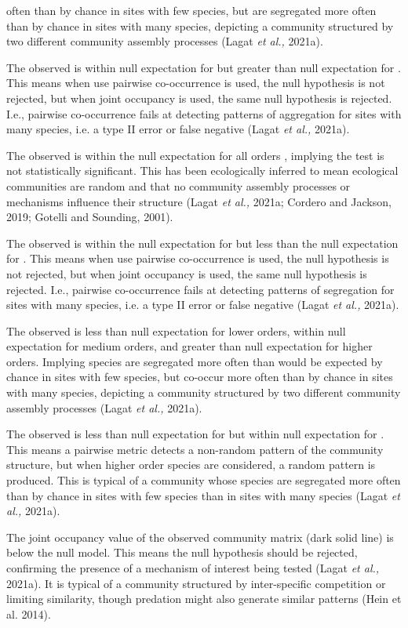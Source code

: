 \documentclass[a4paper]{book}
\begin{document}
\begin{Value}
\begin{ldescription}
often than by chance in sites with few species, but are segregated more often than by chance in
sites with many species, depicting a community structured by two different community assembly
processes (Lagat \emph{et al.,} 2021a).
\item[\code{A4}] The observed is within null expectation for  but greater than null expectation for
. This means when use pairwise co-occurrence is used, the null hypothesis is not
rejected, but when joint occupancy is used, the same null hypothesis is rejected. I.e., pairwise
co-occurrence fails at detecting patterns of aggregation for sites with many species, i.e. a
type II error or false negative (Lagat \emph{et al.,} 2021a).
\item[\code{A5}] The observed is within the null expectation for all orders , implying the
test is not statistically significant. This has been ecologically inferred to mean ecological
communities are random and that no community assembly processes or mechanisms influence their
structure (Lagat \emph{et al.,} 2021a; Cordero and Jackson, 2019; Gotelli and Sounding, 2001).
\item[\code{A6}] The observed is within the null expectation for  but less than the null expectation
for . This means when use pairwise co-occurrence is used, the null hypothesis is not
rejected, but when joint occupancy is used, the same null hypothesis is rejected. I.e., pairwise
co-occurrence fails at detecting patterns of segregation for sites with many species, i.e. a
type II error or false negative (Lagat \emph{et al.,} 2021a).
\item[\code{A7}] The observed is less than null expectation for lower orders, within null expectation
for medium orders, and greater than null expectation for higher orders. Implying species are
segregated more often than would be expected by chance in sites with few species, but co-occur
more often than by chance in sites with many species, depicting a community structured by
two different community assembly processes (Lagat \emph{et al.,} 2021a).
\item[\code{A8}] The observed is less than null expectation for  but within null expectation for
. This means a pairwise metric detects a non-random pattern of the community structure,
but when higher order species are considered, a random pattern is produced. This is typical of a
community whose species are segregated more often than by chance in sites with few species than
in sites with many species (Lagat \emph{et al.,} 2021a).
\item[\code{A9}] The joint occupancy value of the observed community matrix (dark solid line) is below the
null model. This means the null hypothesis should be rejected, confirming the presence of a
mechanism of interest being tested (Lagat \emph{et al.,} 2021a). It is typical of a community
structured by inter-specific competition or limiting similarity, though predation might also
generate similar patterns (Hein et al. 2014).
\end{ldescription}
\end{Value}
\end{document}
